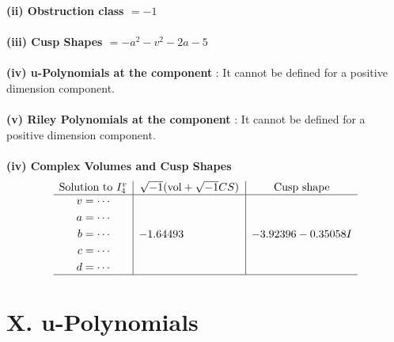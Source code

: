 \documentclass[1p]{elsarticle_modified}
\theoremstyle{definition}
\newcommand{\I}{\sqrt{-1}}
\begin{document}
\flushleft \textbf{(ii) Obstruction class $= -1$}\\~\\
\flushleft \textbf{(iii) Cusp Shapes $= - a^2- v^2-2 a-5$}\\~\\
\flushleft \textbf{(iv) u-Polynomials at the component} : It cannot be defined for a positive dimension component.\\~\\
\flushleft \textbf{(v) Riley Polynomials at the component} : It cannot be defined for a positive dimension component.\\~\\
\newpage\flushleft \textbf{(iv) Complex Volumes and Cusp Shapes}
$$\begin{array}{c|c|c} 
\text{Solution to }I^v_{4}& \I (\text{vol} + \sqrt{-1}CS) & \text{Cusp shape}\\
 \hline 
\begin{aligned}
v &= \cdots \\
a &= \cdots \\
b &= \cdots \\
c &= \cdots \\
d &= \cdots\end{aligned}
 & -1.64493\phantom{ +0.000000I} & -3.92396 - 0.35058 I\\
 \hline 
 \end{array}
$$
\newpage\renewcommand{\arraystretch}{1}
\centering \section*{ X. u-Polynomials}
\end{document}
